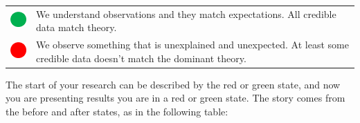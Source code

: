 \documentclass[
]{book}
\begin{document}
\begin{longtable}[]{@{}ll@{}}
\toprule
\endhead
\includegraphics{img/Green dot.png} & We understand observations and they match expectations. All credible data match theory. \\
\includegraphics{img/Red dot.png} & We observe something that is unexplained and unexpected. At least some credible data doesn't match the dominant theory. \\
\bottomrule
\end{longtable}

The start of your research can be described by the red or green state, and now you are presenting results you are in a red or green state. The story comes from the before and after states, as in the following table:
\end{document}
